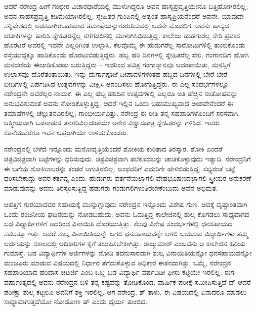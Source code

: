 ಆದರೆ ನರೇಂದ್ರ ಹೀಗೆ ಗಂಭೀರ ವಿಚಾರಧಾರೆಯಲ್ಲಿ ಮುಳುಗಿದ್ದರೂ ಅವನ ಹಾಸ್ಯಪ್ರವೃತ್ತಿಯೇನೂ ಬತ್ತಿಹೋಗಿರಲಿಲ್ಲ; ಅವನ ಸಾಹಸಪ್ರವೃತ್ತಿ ಕಡಿಮೆಯಾಗಿರಲಿಲ್ಲ. ಸ್ನೇಹಿತರ ಗುಂಪಿನಲ್ಲಿ ಅತ್ಯಂತ ಹಾಸ್ಯಪ್ರಿಯನೆಂದರೆ ಅವನೇ. ಯಾವುದೇ ಸನ್ನಿವೇಶದಲ್ಲಿ ಅಡಕವಾಗಿರಬಹುದಾದ ತಮಾಷೆಯನ್ನುಗುರುತಿಸುವಲ್ಲಿ ಅವನೇ ಮೊದಲಿಗ. ಅವನು ಹಾಸ್ಯದ ಚಟಾಕಿಗಳನ್ನು ಹಾರಿಸಿ ಸ್ನೇಹಿತರನ್ನೆಲ್ಲ ನಗೆಗಡಲಿನಲ್ಲಿ ಮುಳುಗಿಸಿಬಿಡುತ್ತಿದ್ದ. ಕಾಲೇಜು ಹುಡಗುರೆಲ್ಲ ಸೇರಿ ಪ್ರವಾಸ ಹೊರಟರೆ ಅವರಲ್ಲಿ ಇವನೇ ಎಲ್ಲರಿಗಿಂತ ಉಲ್ಲಾಸಿ. ಕೆಲವೊಮ್ಮೆ ಈ ಹುಡುಗರೆಲ್ಲ ಸಾರೋಟುಗಳಿಲ್ಲಿ ತುಂಬಿಕೊಂಡು ರಸ್ತೆಯುದ್ದಕ್ಕೂ ಹಾಡಿಕೊಂಡು ಹೊರಟುಬಿಡುತ್ತಿದ್ದರು. ಹಬ್ಬ ಹರಿ ದಿನಗಳಲ್ಲಿ ಸ್ನೇಹಿತರೆಲ್ಲ ಸೇರಿ, ಗಂಗಾನದಿಗೆ ಹೋಗಿ ಮನದಣಿಯೆ ಈಜಾಡಿಕೊಂಡು ಬರುತ್ತಿದ್ದರು – ಇದರಿಂದ ಪವಿತ್ರ ಗಂಗಾಸ್ನಾನವೂ ಆದಂತಾಯಿತು, ಮನಸ್ಸಿಗೆ ಉಲ್ಲಾಸವೂ ದೊರೆತಂತಾಯಿತು. ಇನ್ನು ದುರ್ಗಾಪೂಜೆ ದೀಪಾವಳಿಗಳಂತಹ ಹಬ್ಬದ ದಿನಗಳಲ್ಲಿ ಬೇರೆ ಬೇರೆ ಬೀದಿಗಳಲ್ಲಿ ಏರ್ಪಡಿಸಿದ ಉತ್ಸವಗಳನ್ನು ವೀಕ್ಷಿಸಿ ಆನಂದಿಸಲು ಹೋಗುತ್ತಿದ್ದರು. ಈ ಎಲ್ಲ ಸಂದರ್ಭಗಳಲ್ಲೂ ನರೇಂದ್ರನೇ ಅವರೆಲ್ಲರ ನಾಯಕ. ಈ ಎಲ್ಲ ಹಬ್ಬ ಹರಿದಿನ ಉತ್ಸವಗಳಲ್ಲಿ ಎಲ್ಲರೂ ಅತಿ ಹೆಚ್ಚಿನ ಸಂತೋಷವನ್ನು ಅನುಭವಿಸುವಂತೆ ಅವನು ನೋಡಿಕೊಳ್ಳುತ್ತಿದ್ದ. ಆದರೆ ಇಲ್ಲಿನ ಒಂದು ಬಹುಮುಖ್ಯವಾದ ಅಂಶವೇನೆಂದರೆ ಈ ತಮಾಷೆಗಳಲ್ಲಿ ಚೆಲ್ಲುತನವಿರಲಿಲ್ಲ; ಗಾಂಭೀರ್ಯವಿತ್ತು. ನರೇಂದ್ರ ಈ ರೀತಿ ತನ್ನ ಸಹಪಾಠಿಗಳೊಂದಿಗೆ ಸರಸವಾಗಿ, ಆತ್ಮೀಯವಾಗಿ ಒಡನಾಡುತ್ತ ತನಗರಿವಿಲ್ಲದಂತೆಯೇ ಅನೇಕ ವಿಶ್ವಾಸಪಾತ್ರ ಸ್ನೇಹಿತರನ್ನು ಗಳಿಸಿದ. ಇವರು ಕೊನೆಯವರೆಗೂ ಇವನ ಆಪ್ತರಾಗಿಯೇ ಉಳಿದುಕೊಂಡರು.

ನರೇಂದ್ರನಲ್ಲಿ ಬೆಳೆದ ಇನ್ನೊಂದು ಮನೋವೃತ್ತಿಯೆಂದರೆ ಶೋಕಿಯ ಕುರಿತಾದ ತಿರಸ್ಕಾರ. ಶೋಕಿ ಎಂದರೆ ಚಿತ್ರವಿಚಿತ್ರವಾಗಿ ಬಟ್ಟೆಗಳನ್ನು ಧರಿಸುವುದು. ಚಿತ್ರವಿಚಿತ್ರವಾಗಿ ತಲೆಕೂದಲನ್ನು ಚಾಚಿಕೊಳ್ಳುವುದು ಇತ್ಯಾದಿ. ನರೇಂದ್ರನಿಗೆ ಈ ಬಗೆಯ ಶೋಕಿಲಾಲರನ್ನು ಕಂಡರೆ ಆಗುತ್ತಿರಲಿಲ್ಲ. ಅಂಥವರಿಗೆ ಎದುರಿಗೇ ಹೇಳಿಬಿಡುತ್ತಿದ್ದ, ಸಭ್ಯರಂತೆ ಬಟ್ಟೆ ಧರಿಸಬೇಕಾದ್ದು ಅವರ ಕರ್ತವ್ಯ ಎಂದು. ಹುಡುಗರು ವರ್ತನೆಯಲ್ಲಾಗಲಿ ವೇಷಭೂಷಣದಲ್ಲಾಗಲಿ ಸ್ತ್ರೀಯರ ಅನುಕರಣೆ ಮಾಡುವುದನ್ನು ಅವನು ತಿರಸ್ಕರಿಸುತ್ದಿದ್ದ ಹಡುಗರು ಗಂಡುಗಲಿಗಳಂತಿರಬೇಕೆಂಬುದು ಅವನ ಅಭಿಮತ.

ಆಪತ್ತಿಗೆ ಗುರಯಾದವರ ಸಹಾಯಕ್ಕೆ ಮುನ್ನುಗ್ಗುವುದು ನರೇಂದ್ರನ ಇನ್ನೊಂದು ವಿಶೇಷ ಗುಣ. ಅದಕ್ಕೆ ದೃಷ್ಟಾಂತವಾಗಿ ಒಂದು ರಂಜನೀಯ ಘಟನೆಯನ್ನು ನೋಡಬಹುದು. ಅವನು ಓದುತ್ತಿದ್ದ ಕಾಲೇಜಿನಲ್ಲಿ ಶುಲ್ಕ ಕೊಗಡಲು ಸಾಧ್ಯವಾಗದ ಬಡ ವಿದ್ಯಾರ್ಥಿಗಳಿಗೆ ಅದರಿಂದ ವಿನಾಯಿತಿ ದೊರೆಯುತ್ತಿತ್ತು. ಕೆಲವು ವಿಶೇಷ ಸಂದರ್ಭಗಳಲ್ಲಿ ಧನಸಹಾಯದ ಸವಲತ್ತೂ ಇತ್ತು. ಆದರೆ ಶುಲ್ಕ ವಿನಾಯಿತಿಯನ್ನೇ ಆಗಲಿ ಧನಸಹಾಯವನ್ನೇ ಆಗಲಿ ಬಯಸುವ ವಿದ್ಯಾರ್ಥಿಗಳು ತಮ್ಮ ಅರ್ಜಿಯನ್ನು ಸಕಾಲದಲ್ಲಿ ಅಧಿಕಾರಿಗಳ ಕೈಗೆ ತಲುಪಿಸಬೇಕಾಗಿತ್ತು. ರಾಜ್ಕುಮಾರ್ ಎಂಬವನು ಆ ಕಾಲೇಜಿನ ಹಿರಿಯ ಗುಮಾಸ್ತೆ. ಬಡ ವಿದ್ಯಾರ್ಥಿಗಳ ಅರ್ಜಿಗಳನ್ನು ನೋಡಿ ತದನುಸಾರವಾಗಿ ಶುಲ್ಕ ವಿನಾಯಿತಿಯನ್ನೋ ಧನಸಹಾಯವನ್ನೋ ಮಂಜೂರು ಮಾಡುವ ವಿಷಯದಲ್ಲಿ ನಿರ್ಧಾರ ತೆಗೆದುಕೊಳ್ಳುವ ಅಧಿಕಾರ ಈತನದಾಗಿತ್ತು. ಒಮ್ಮೆ, ನರೇಂದ್ರನ ಸಹಪಾಠಿಯಾದ ಹರಿದಾಸ ಚಟರ್ಜಿ ಎಂಬ ಒಬ್ಬ ಬಡ ವಿದ್ಯಾರ್ಥಿ ವರ್ಷವಿಡೀ ಫೀಸು ಕಟ್ಟಿಯೇ ಇರಲಿಲ್ಲ. ಈಗ ವರ್ಷಾಂತ್ಯದಲ್ಲಿ ಅವನು ನರೇಂದ್ರನ ಬಳಿ ತನ್ನ ಕಷ್ಟವನ್ನು ತೋಡಿಕೊಂಡ. ವಾರ್ಷಿಕ ಪರೀಕ್ಷೆ ಸಮೀಪಿಸುತ್ತಿದೆ ದ್ ಆದರೆ ಪರೀಕ್ಷಾ ಶುಲ್ಕ ಕಟ್ಟಲೂ ಅವನಿಗೆ ಶಕ್ತಿ ಇರಲಿಲ್ಲ. ಆಗ ನರೇಂದ್ರ, ಶ್ ತಾಳು, ಈ ವಿಷಯದಲ್ಲಿ ಏನಾದರೂ ಮಾಡಲು ಸಾಧ್ಯಾವಾಗುತ್ತದೆಯೋ ನೋಡೋಣ ಷ್ ಎಂದು ಧೈರ್ಯ ತುಂಬಿದ.

